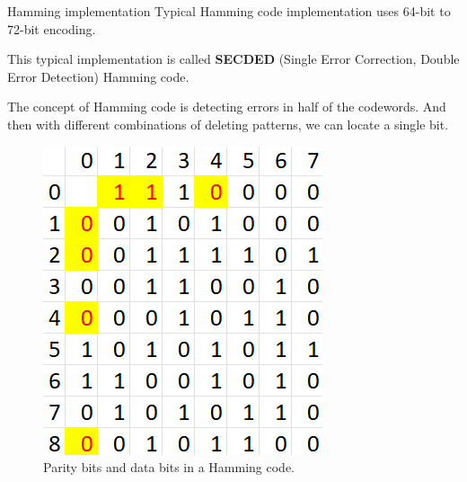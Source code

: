 \documentclass{beamer}
\begin{document}
\begin{frame}{Hamming implementation}
    Typical Hamming code implementation uses 64-bit to 72-bit encoding.

    This typical implementation is called \textbf{SECDED} (Single Error Correction,
    Double Error Detection) Hamming code.

    The concept of Hamming code is detecting errors in half of the codewords. And
    then with different combinations of deleting patterns, we can locate a single
    bit.

    \begin{figure}[htbp]
        \centerline{\includegraphics[scale = 0.6]{Images/Hamming_example.png}}
        \caption{Parity bits and data bits in a Hamming code.}
    \end{figure}
\end{frame}
\end{document}
